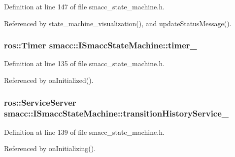 Definition at line 147 of file smacc\+\_\+state\+\_\+machine.\+h.



Referenced by state\+\_\+machine\+\_\+visualization(), and update\+Status\+Message().

\subsubsection[{\texorpdfstring{timer\+\_\+}{timer_}}]{\setlength{\rightskip}{0pt plus 5cm}ros\+::\+Timer smacc\+::\+I\+Smacc\+State\+Machine\+::timer\+\_\+\hspace{0.3cm}{\ttfamily [protected]}}\hypertarget{classsmacc_1_1ISmaccStateMachine_ab6b00dc92aa86f1074d795fb4057e5bc}{}\label{classsmacc_1_1ISmaccStateMachine_ab6b00dc92aa86f1074d795fb4057e5bc}


Definition at line 135 of file smacc\+\_\+state\+\_\+machine.\+h.



Referenced by on\+Initialized().

\subsubsection[{\texorpdfstring{transition\+History\+Service\+\_\+}{transitionHistoryService_}}]{\setlength{\rightskip}{0pt plus 5cm}ros\+::\+Service\+Server smacc\+::\+I\+Smacc\+State\+Machine\+::transition\+History\+Service\+\_\+\hspace{0.3cm}{\ttfamily [protected]}}\hypertarget{classsmacc_1_1ISmaccStateMachine_a73e2a7ca89c3d807eafe5cfb1e86ea05}{}\label{classsmacc_1_1ISmaccStateMachine_a73e2a7ca89c3d807eafe5cfb1e86ea05}


Definition at line 139 of file smacc\+\_\+state\+\_\+machine.\+h.



Referenced by on\+Initializing().

